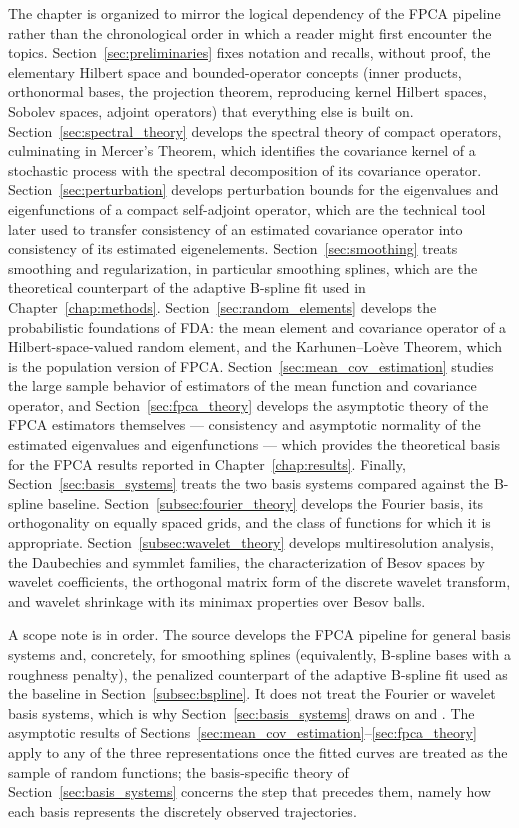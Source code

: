 The chapter is organized to mirror the logical dependency of the FPCA
pipeline rather than the chronological order in which a reader might first
encounter the topics. Section~\ref{sec:preliminaries} fixes notation and
recalls, without proof, the elementary Hilbert space and bounded-operator
concepts (inner products, orthonormal bases, the projection theorem,
reproducing kernel Hilbert spaces, Sobolev spaces, adjoint operators) that
everything else is built on. Section~\ref{sec:spectral_theory} develops the
spectral theory of compact operators, culminating in Mercer's Theorem, which
identifies the covariance kernel of a stochastic process with the spectral
decomposition of its covariance operator. Section~\ref{sec:perturbation}
develops perturbation bounds for the eigenvalues and eigenfunctions of a
compact self-adjoint operator, which are the technical tool later used to
transfer consistency of an estimated covariance operator into consistency
of its estimated eigenelements. Section~\ref{sec:smoothing} treats
smoothing and regularization, in particular smoothing splines, which are
the theoretical counterpart of the adaptive B-spline fit used in
Chapter~\ref{chap:methods}.
Section~\ref{sec:random_elements} develops the probabilistic foundations of
FDA: the mean element and covariance operator of a Hilbert-space-valued
random element, and the Karhunen--Lo\`eve Theorem, which is the population
version of FPCA. Section~\ref{sec:mean_cov_estimation} studies the large
sample behavior of estimators of the mean function and covariance operator,
and Section~\ref{sec:fpca_theory} develops the asymptotic theory of the FPCA
estimators themselves --- consistency and asymptotic normality of the
estimated eigenvalues and eigenfunctions --- which provides the theoretical
basis for the FPCA results reported in Chapter~\ref{chap:results}. Finally,
Section~\ref{sec:basis_systems} treats the two basis systems compared against
the B-spline baseline. Section~\ref{subsec:fourier_theory} develops the Fourier basis, its
orthogonality on equally spaced grids, and the class of functions for which
it is appropriate. Section~\ref{subsec:wavelet_theory} develops multiresolution
analysis, the Daubechies and symmlet families, the characterization of Besov
spaces by wavelet coefficients, the orthogonal matrix form of the discrete
wavelet transform, and wavelet shrinkage with its minimax properties over
Besov balls.

A scope note is in order. The source \cite{hsingeubank2015} develops the
FPCA pipeline for general basis systems and, concretely, for smoothing
splines (equivalently, B-spline bases with a roughness penalty), the
penalized counterpart of the adaptive B-spline fit used as the baseline in
Section~\ref{subsec:bspline}. It does not treat the Fourier or wavelet basis
systems, which is why Section~\ref{sec:basis_systems} draws on
\cite{ramsay2005} and \cite{vidakovic1999}. The asymptotic results of
Sections~\ref{sec:mean_cov_estimation}--\ref{sec:fpca_theory} apply to any of
the three representations once the fitted curves are treated as the sample of
random functions; the basis-specific theory of
Section~\ref{sec:basis_systems} concerns the step that precedes them, namely
how each basis represents the discretely observed trajectories.

